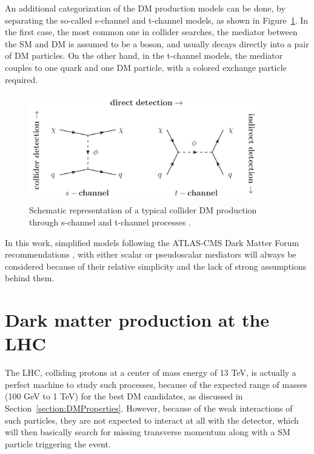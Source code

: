 \documentclass[a4paper, 10pt, openright]{report}
\begin{document}
An additional categorization of the \ac{DM} production models can be done, by separating the so-called s-channel and t-channel models, as shown in Figure~\ref{fig:STChannels}. In the first case, the most common one in collider searches, the mediator between the \ac{SM} and \ac{DM} is assumed to be a boson, and usually decays directly into a pair of \ac{DM} particles. On the other hand, in the t-channel models, the mediator couples to one quark and one \ac{DM} particle, with a colored exchange particle required.

\begin{figure}[htbp]
\begin{center}
\includegraphics[width=10cm, height=4.7cm]{figs/STChannels.png}
\caption{Schematic representation of a typical collider \ac{DM} production through s-channel and t-channel processes \cite{STChannels}.}
\label{fig:STChannels}
\end{center}
\end{figure}

In this work, simplified models following the ATLAS-CMS Dark Matter Forum recommendations \cite{Forum}, with either scalar or pseudoscalar mediators will always be considered because of their relative simplicity and the lack of strong assumptions behind them.%

\section{Dark matter production at the LHC} \label{section:ourChannel}

The \ac{LHC}, colliding protons at a center of mass energy of 13 TeV, is actually a perfect machine to study such processes, because of the expected range of masses (100 GeV to 1 TeV) for the best \ac{DM} candidates, as discussed in Section~\ref{section:DMProperties}. However, because of the weak interactions of such particles, they are not expected to interact at all with the detector, which will then basically search for missing transverse momentum along with a \ac{SM} particle triggering the event.
\end{document}
